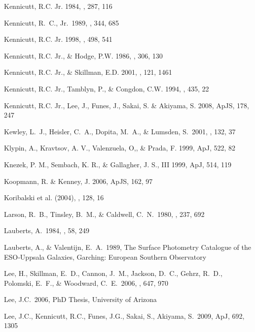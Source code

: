 \documentclass[12pt,onecolumn]{emulateapj}
\begin{document}
\begin{thebibliography}{}
Kennicutt, R.C. Jr. 1984, \apj , 287, 116

Kennicutt, R.~C., Jr.\ 1989, \apj, 344, 685 

Kennicutt, R.C. Jr. 1998, \apj , 498, 541

Kennicutt, R.C. Jr., \& Hodge, P.W. 1986, \apj , 306, 130

Kennicutt, R.C. Jr., \& Skillman, E.D. 2001, \aj , 121, 1461 

Kennicutt, R.C. Jr., Tamblyn, P., \& Congdon, C.W. 1994, \apj , 435, 22

Kennicutt, R.C. Jr., Lee, J., Funes, J., Sakai, S. \& Akiyama, S. 2008, ApJS, 178, 247

Kewley, L.~J., Heisler, C.~A., Dopita, M.~A., \& Lumsden, S.\ 2001, \apjs, 132, 37 

Klypin, A., Kravtsov, A. V., Valenzuela, O,, \& Prada, F. 1999, ApJ, 522, 82

Knezek, P. M., Sembach, K. R., \& Gallagher, J. S., III 1999, ApJ, 514, 119

Koopmann, R. \& Kenney, J. 2006, ApJS, 162, 97

Koribalski et al. (2004),  \aj, 128, 16

Larson, R.~B., Tinsley, B.~M., \& Caldwell, C.~N.\ 1980, \apj, 237, 692 

Lauberts, A.\ 1984, \aaps, 58, 249 

Lauberts, A., \& Valentijn, E.~A.\ 1989,
The Surface Photometry Catalogue of the ESO‐Uppsala Galaxies,
Garching: European Southern Observatory  

Lee, H., Skillman, E.~D., Cannon, J.~M., Jackson, D.~C., Gehrz, R.~D., 
Polomski, E.~F., \& Woodward, C.~E.\ 2006, \apj, 647, 970 

Lee, J.C.\ 2006, PhD Thesis, University of Arizona

Lee, J.C., Kennicutt, R.C., Funes, J.G., Sakai, S., Akiyama, S.\ 2009, ApJ, 692, 1305


\end{thebibliography}
\end{document}

